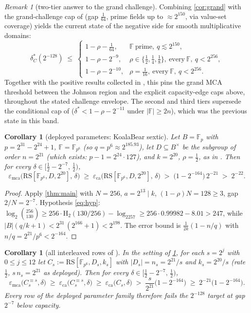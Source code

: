 \documentclass[11pt]{article}
\newtheorem{corollary}[theorem]{Corollary}
\theoremstyle{definition}
\theoremstyle{remark}
\newtheorem{remark}[theorem]{Remark}
\newcommand{\F}{\mathbb{F}}
\newcommand{\B}{B}
\newcommand{\RS}{\mathrm{RS}}
\newcommand{\eca}{\varepsilon_{\mathrm{ca}}}
\newcommand{\emca}{\varepsilon_{\mathrm{mca}}}
\newcommand{\Hb}{\mathrm{H}_2}
\begin{document}
\begin{remark}[two-tier answer to the grand challenge]\label{rem:twotier}
Combining \cref{cor:grand} with the grand-challenge cap of \cite[Prop.\ ``Grand-challenge cap'']{Cho26b} (gap $\frac1{64}$, prime fields up to $\approx2^{150}$, via value-set coverage) yields the current state of the negative side for smooth multiplicative domains:
\[
\delta^*_C(2^{-128})\;\le\;
\begin{cases}
1-\rho-\frac1{64}, & \F\ \text{prime},\ q\lesssim2^{150},\\[2pt]
1-\rho-2^{-9}, & \rho\in\{\frac12,\frac14,\frac18\},\ \text{every}\ \F,\ q<2^{256},\\[2pt]
1-\rho-2^{-10}, & \rho=\frac1{16},\ \text{every}\ \F,\ q<2^{256}.
\end{cases}
\]
Together with the positive results collected in \cite[Table~1]{ABF26}, this pins the grand MCA threshold between the Johnson region and the explicit capacity-edge caps above, throughout the stated challenge envelope. The second and third tiers supersede the conditional cap of \cite[Thm.\ ``Universal cap'']{Cho26b} ($\delta^*<1-\rho-2^{-11}$ under $|\F|\ge2n$), which was the previous state in this band.
\end{remark}

\begin{corollary}[deployed parameters: KoalaBear sextic]\label{cor:deployed}
Let $\B=\F_p$ with $p=2^{31}-2^{24}+1$, $\F=\F_{p^6}$ (so $q=p^6\approx2^{185.93}$), let $D\subseteq\B^\times$ be the subgroup of order $n=2^{21}$ (which exists: $p-1=2^{24}\cdot127$), and $k=2^{20}$, $\rho=\frac12$, as in \cite[\S6.3]{ABF26}. Then for every $\delta\in\bigl[\frac12-2^{-7},\,\frac12\bigr)$,
\[
\emca\bigl(\RS[\F_{p^6},D,2^{20}],\,\delta\bigr)\;\ge\;\eca\bigl(\RS[\F_{p^6},D,2^{20}],\,\delta\bigr)\;>\;\bigl(1-2^{-164}\bigr)\,2^{-21}\;>\;2^{-22}.
\]
\end{corollary}

\begin{proof}
Apply \cref{thm:main} with $N=256$, $a=2^{13}\mid k$, $(1-\rho)N=128\ge3$, gap $2/N=2^{-7}$. Hypothesis \eqref{eq:hyp}: $\log_2\binom{256}{130}\ge256\cdot\Hb(130/256)-\log_2257\ge256\cdot0.99982-8.01>247$, while $|\B|(q/k+1)<2^{31}\,(2^{166}+1)<2^{198}$. The error bound is $\frac1{2k}(1-n/q)$ with $n/q=2^{21}/p^6<2^{-164}$.
\end{proof}

\begin{corollary}[all interleaved rows of {\cite[Tables 2--3]{ABF26}}]\label{cor:rows}
In the setting of \cref{cor:deployed}, for each $s=2^j$ with $0\le j\le12$ let $C_s:=\RS[\F_{p^6},D_s,k_s]$ with $|D_s|=n_s=2^{21}/s$ and $k_s=2^{20}/s$ (rate $\frac12$, $s\,n_s=2^{21}$ as deployed). Then for every $\delta\in\bigl[\frac12-2^{-7},\,\frac12\bigr)$,
\[
\emca\bigl(C_s^{\equiv s},\delta\bigr)\;\ge\;\eca\bigl(C_s^{\equiv s},\delta\bigr)\;\ge\;\eca\bigl(C_s,\delta\bigr)\;>\;\frac s{2^{21}}\bigl(1-2^{-164}\bigr)\;\ge\;2^{-21}\bigl(1-2^{-164}\bigr).
\]
Every row of the deployed parameter family therefore fails the $2^{-128}$ target at gap $2^{-7}$ below capacity.
\end{corollary}
\end{document}
